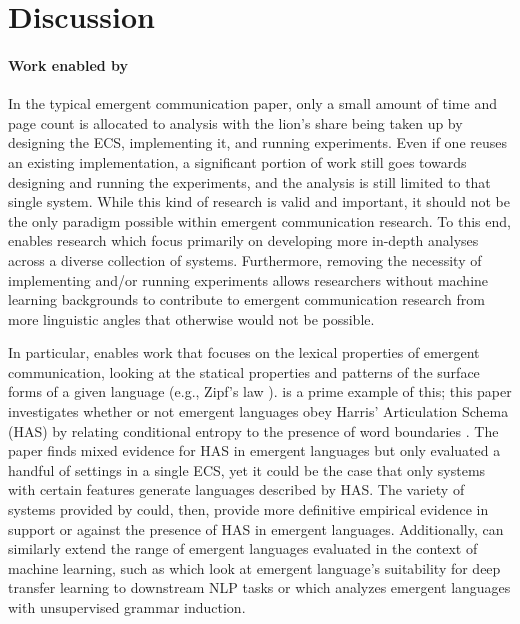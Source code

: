 \section{Discussion}
\unskip\label{elcc:sec:discussion}


\paragraph{Work enabled by \theLib{}}
In the typical emergent communication paper, only a small amount of time and page count is allocated to analysis with the lion's share being taken up by designing the ECS, implementing it, and running experiments.
Even if one reuses an existing implementation, a significant portion of work still goes towards designing and running the experiments, and the analysis is still limited to that single system.
While this kind of research is valid and important, it should not be the only paradigm possible within emergent communication research.
To this end, \theLib{} enables research which focus primarily on developing more in-depth analyses across a diverse collection of systems.
Furthermore, removing the necessity of implementing and/or running experiments allows researchers without machine learning backgrounds to contribute to emergent communication research from more linguistic angles that otherwise would not be possible.

In particular, \theLib{} enables work that focuses on the lexical properties of emergent communication, looking at the statical properties and patterns of the surface forms of a given language (e.g., Zipf's law \citep{zipf}).
\citet{ueda2023on} is a prime example of this; this paper investigates whether or not emergent languages obey Harris' Articulation Schema (HAS) by relating conditional entropy to the presence of word boundaries \citep{harris,Tanaka-Ishii2021}.
The paper finds mixed evidence for HAS in emergent languages but only evaluated a handful of settings in a single ECS\@, yet it could be the case that only systems with certain features generate languages described by HAS\@.
The variety of systems provided by \theLib{} could, then, provide more definitive empirical evidence in support or against the presence of HAS in emergent languages.
Additionally, \theLib{} can similarly extend the range of emergent languages evaluated in the context of machine learning, such as \citet{yao2022linking,xferbench} which look at emergent language's suitability for deep transfer learning to downstream NLP tasks or \citet{van-der-wal-etal-2020-grammar} which analyzes emergent languages with unsupervised grammar induction.

